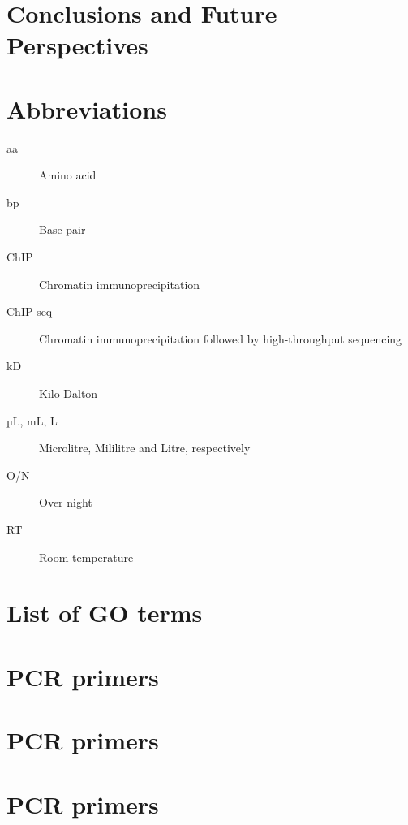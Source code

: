 \documentclass[11pt,twoside,a4paper]{report}
\begin{document}
\clearpage

\chapter{Conclusions and Future Perspectives}



\cleardoublepage
%
%




\cleardoublepage
\begin{appendices}
	\chapter{Abbreviations}
		\begin{description}
			\item[aa] Amino acid
			\item[bp] Base pair
			\item[ChIP] Chromatin immunoprecipitation
			\item[ChIP-seq] Chromatin immunoprecipitation followed by high-throughput sequencing
			\item[kD] Kilo Dalton
			\item[µL, mL, L] Microlitre, Mililitre and Litre, respectively
			\item[O/N] Over night
			\item[RT] Room temperature
		\end{description}

	\chapter{List of GO terms}
	\chapter{PCR primers}
	\chapter{PCR primers}
	\chapter{PCR primers}
\end{appendices}
\end{document}
